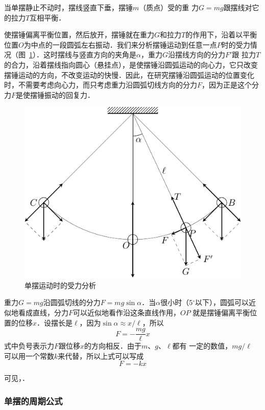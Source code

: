 当单摆静止不动时，摆线竖直下垂，摆锤$m$（质点）受的重
力$G=mg$跟摆线对它的拉力$T$互相平衡．

使摆锤偏离平衡位置，然后放开，摆锤就在重力$G$和拉力$T$的作用下，沿着以平衡位置$O$为中点的一段圆弧左右振动．我们来分析摆锤运动到任意一点$P$时的受力情况（图~\ref{fig_A_9-3}）．这时摆线与竖直方向的夹角是$\alpha$，重力$G$沿摆线方向的分力$F'$跟
拉力$T$的合力，沿着摆线指向圆心（悬挂点），是使摆锤沿圆弧运动的向心力，它只改变摆锤运动的方向，不改变运动的快慢．因此，在研究摆锤沿圆弧运动的位置变化时，不需要考虑向心力，而只考虑重力沿圆弧切线方向的分力$F$，因为正是这个分力$F$是使摆锤振动的回复力．
\begin{figure}[htbp]
    \centering
    \includegraphics{fig/A/9-3.pdf}
    \caption{单摆运动时的受力分析}\label{fig_A_9-3}
\end{figure}
    
重力$G=mg$沿圆弧切线的分力$F=mg\sin\alpha$．当$\alpha$很小时（5$^\circ$以下），圆弧可以近似地看成直线，分力$F$可以近似地看作沿这条直线作用，$OP$ 就是摆锤偏离平衡位置的位移$x$．设摆长是$\ell$，因为$\sin\alpha\approx x/\ell$，所以
\[F=-\frac{mg}{\ell}x\]
式中负号表示力$F$跟位移$x$的方向相反．由于$m$、$g$、$\ell$都有
一定的数值，$mg/\ell$
可以用一个常数$k$来代替，所以上式可以写成
\[F=-kx\]

可见，．

\subsubsection{单摆的周期公式}

